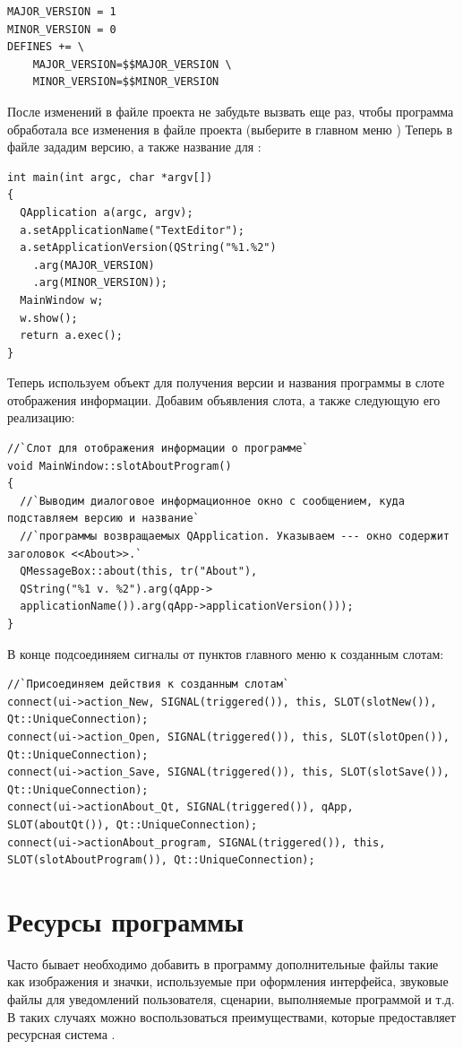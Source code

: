 \begin{lstlisting}
MAJOR_VERSION = 1
MINOR_VERSION = 0
DEFINES += \
    MAJOR_VERSION=$$MAJOR_VERSION \
    MINOR_VERSION=$$MINOR_VERSION
\end{lstlisting}

После изменений в файле проекта не забудьте вызвать  еще раз, чтобы программа 
обработала все изменения в файле
проекта (выберите в главном меню \Sys{Build->Run qmake}) Теперь в файле \Sys{main.cpp} зададим версию, а также
название для : 
\begin{lstlisting}
int main(int argc, char *argv[])
{
  QApplication a(argc, argv);
  a.setApplicationName("TextEditor");
  a.setApplicationVersion(QString("%1.%2")
    .arg(MAJOR_VERSION)
    .arg(MINOR_VERSION));
  MainWindow w;
  w.show();
  return a.exec();
}
\end{lstlisting}

Теперь используем объект  для получения версии и названия программы в слоте отображения информации. Добавим
объявления слота, а также следующую его реализацию: 
\begin{lstlisting}
//`Слот для отображения информации о программе`
void MainWindow::slotAboutProgram()
{
  //`Выводим диалоговое информационное окно с сообщением, куда подставляем версию и название`
  //`программы возвращаемых QApplication. Указываем --- окно содержит заголовок <<About>>.`
  QMessageBox::about(this, tr("About"), 
  QString("%1 v. %2").arg(qApp->
  applicationName()).arg(qApp->applicationVersion()));
}
\end{lstlisting}

В конце подсоединяем сигналы от пунктов главного меню к созданным слотам: 
\begin{lstlisting}
//`Присоединяем действия к созданным слотам`
connect(ui->action_New, SIGNAL(triggered()), this, SLOT(slotNew()), Qt::UniqueConnection);
connect(ui->action_Open, SIGNAL(triggered()), this, SLOT(slotOpen()), Qt::UniqueConnection);
connect(ui->action_Save, SIGNAL(triggered()), this, SLOT(slotSave()), Qt::UniqueConnection);
connect(ui->actionAbout_Qt, SIGNAL(triggered()), qApp, SLOT(aboutQt()), Qt::UniqueConnection);
connect(ui->actionAbout_program, SIGNAL(triggered()), this, SLOT(slotAboutProgram()), Qt::UniqueConnection);
\end{lstlisting}

\section[Ресурсы программы]{Ресурсы программы}
Часто бывает необходимо добавить в программу дополнительные файлы такие как изображения и значки, используемые при
оформления интерфейса, звуковые файлы для уведомлений пользователя, сценарии, выполняемые программой и т.д. В таких
случаях можно воспользоваться преимуществами, которые предоставляет ресурсная система \Sys{Qt}. 

